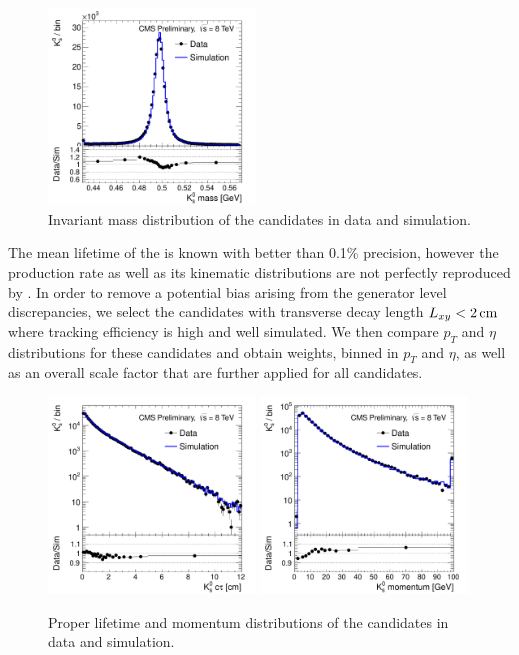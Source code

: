 \begin{figure}[htbp]
\centering
\includegraphics[width=0.49\textwidth]{plots/kshort/ksmass.pdf}
\caption{Invariant mass distribution of the \Kshort candidates in data and simulation. \label{fig:ksmass}}
\end{figure} 


The mean lifetime of the \Kshort is known with better than 0.1\% precision, however the \Kshort
production rate as well as its kinematic distributions are not perfectly reproduced 
by \PYTHIA \cite{Khachatryan:2011tm}.
In order to remove a potential bias arising from the generator level discrepancies, 
we select the \Kshort candidates with transverse decay length $L_{xy}<2\,\text{cm}$ where tracking efficiency
is high and well simulated. We then compare $p_T$ and $\eta$ distributions for these candidates and obtain
weights, binned in $p_T$ and $\eta$, as well as an overall scale factor that are further
 applied for all \Kshort candidates. 

\begin{figure}[htbp]
\centering
\includegraphics[width=0.49\textwidth]{plots/kshort/ksctau.pdf}
\includegraphics[width=0.49\textwidth]{plots/kshort/ksp.pdf}
\caption{Proper lifetime and momentum distributions of the \Kshort candidates in data and simulation. \label{fig:ksctau}}
\end{figure}

